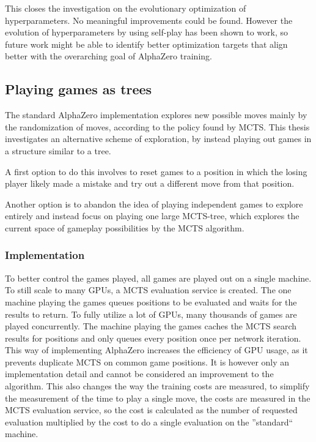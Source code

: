 \documentclass[12pt,onecolumn,oneside,titlepage]{article}
\begin{document}
This closes the investigation on the evolutionary optimization of hyperparameters. No meaningful improvements could be found. However the evolution of hyperparameters by using self-play has been shown to work,
so future work might be able to identify better optimization targets that align better with the overarching goal of AlphaZero training.


\subsection{Playing games as trees}

The standard AlphaZero implementation explores new possible moves mainly by the randomization of moves, according to the policy found by MCTS.
This thesis investigates an alternative scheme of exploration, by instead playing out games in a structure similar to a tree.

A first option to do this involves to reset games to a position in which the losing player likely made a mistake and try out a different move from that position.

Another option is to abandon the idea of playing independent games to explore entirely and instead focus on playing one large MCTS-tree, which explores the current space of gameplay possibilities by the MCTS algorithm.

\subsubsection{Implementation}

To better control the games played, all games are played out on a single machine. To still scale to many GPUs, a MCTS evaluation service is created. The one machine playing the games queues positions to be evaluated and waits for
the results to return. To fully utilize a lot of GPUs, many thousands of games are played concurrently. The machine playing the games caches the MCTS search results for positions and only queues every position once per network iteration. This 
way of implementing AlphaZero increases the efficiency of GPU usage, as it prevents duplicate MCTS on common game positions. It is however only an implementation detail and cannot be considered an improvement to the algorithm.
This also changes the way the training costs are measured, to simplify the measurement of the time to play a single move, the costs are measured in the MCTS evaluation service, so the cost is calculated as the number of requested evaluation multiplied
by the cost to do a single evaluation on the ''standard`` machine.
\end{document}
